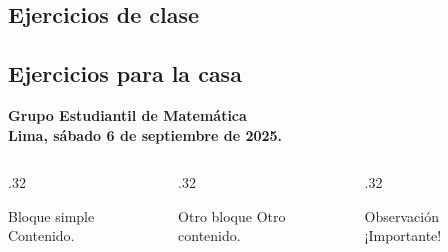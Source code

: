 \vspace*{-1.7\baselineskip}\setlength\belowdisplayshortskip{0pt}
\subsection*{\sffamily\color{AmurmapleBlue!80!black}Ejercicios de clase~}

\begin{questions}
	
\end{questions}

\cleardoublepage

\subsection*{\sffamily\color{AmurmapleBlue!80!black}Ejercicios para la casa~}

\begin{questions}
	
	
	
	
	
	
\end{questions}
\vfill
\begin{flushright}\sffamily\bfseries\color{AmurmapleBlue!80!black}
	Grupo Estudiantil de Matemática\\[2mm]
	Lima, sábado 6 de septiembre de 2025.
\end{flushright}



\begin{columns}
	\begin{column}{.32\paperwidth}
		\begin{block}{Bloque simple}
			Contenido.
		\end{block}
	\end{column}
	\begin{column}{.32\paperwidth}
		\begin{exampleblock}{Otro bloque}
			Otro contenido.
		\end{exampleblock}
	\end{column}
	\begin{column}{.32\paperwidth}
		\begin{alertblock}{Observación}
			¡Importante!
		\end{alertblock}
	\end{column}
\end{columns}
